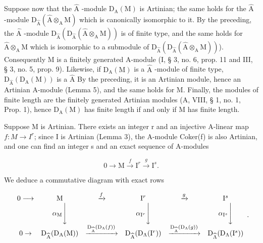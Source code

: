 Suppose now that the \(\widehat{\mathrm{A}}\) -module \(\mathrm{D}_{\mathrm{A}}(\mathrm{M})\) is Artinian; the same holds for the \(\widehat{\mathrm{A}}\) -module \(\mathrm{D}_{\widehat{\mathrm{A}}}(\widehat{\mathrm{A}} \otimes_{\mathrm{A}} \mathrm{M})\) which is canonically isomorphic to it. By the preceding, the \(\widehat{\mathrm{A}}\) -module \(\mathrm{D}_{\widehat{\mathrm{A}}}(\mathrm{D}_{\widehat{\mathrm{A}}}(\widehat{\mathrm{A}} \otimes_{\mathrm{A}} \mathrm{M}))\) is of finite type, and the same holds for \(\widehat{\mathrm{A}} \otimes_{\mathrm{A}} \mathrm{M}\) which is isomorphic to a submodule of \(\mathrm{D}_{\widehat{\mathrm{A}}}(\mathrm{D}_{\widehat{\mathrm{A}}}(\widehat{\mathrm{A}} \otimes_{\mathrm{A}} \mathrm{M}))\)). Consequently M is a finitely generated A-module (I, § 3, no. 6, prop. 11 and III, § 3, no. 5, prop. 9). Likewise, if \(\mathrm{D}_{\mathrm{A}}(\mathrm{M})\) is a \(\widehat{\mathrm{A}}\) -module of finite type, \(\mathrm{D}_{\widehat{\mathrm{A}}}(\mathrm{D}_{\mathrm{A}}(\mathrm{M}))\) is a \(\widehat{\mathrm{A}}\) By the preceding, it is an Artinian module, hence an Artinian A-module (Lemma 5), and the same holds for M. Finally, the modules of finite length are the finitely generated Artinian modules (A, VIII, § 1, no. 1, Prop. 1), hence \(\mathrm{D}_{\mathrm{A}}(\mathrm{M})\) has finite length if and only if M has finite length.

Suppose M is Artinian. There exists an integer r and an injective A-linear map \(f : M \to I^{r}\); since I is Artinian (Lemma 3), the A-module Coker(f) is also Artinian, and one can find an integer s and an exact sequence of A-modules

\[
0 \to \mathrm{M} \stackrel {f} {\longrightarrow} \mathrm{I} ^ {r} \stackrel {g} {\longrightarrow} \mathrm{I} ^ {s}.
\]

We deduce a commutative diagram with exact rows

\[
\begin{array}{c c c c c c} 0 \longrightarrow & \mathrm{M} & \xrightarrow {f} & \mathrm{I} ^ {r} & \xrightarrow {g} & \mathrm{I} ^ {s} \\ & \alpha_ {\mathrm{M}} \Biggl \downarrow & & \alpha_ {\mathrm{I} ^ {r}} \Biggl \downarrow & & \alpha_ {\mathrm{I} ^ {s}} \Biggl \downarrow \\ 0 \to & \mathrm{D} _ {\widehat {\mathrm{A}}} (\mathrm{D} _ {\mathrm{A}} (\mathrm{M})) & \xrightarrow {\mathrm{D} _ {\widehat {\mathrm{A}}} (\mathrm{D} _ {\Lambda} (f))} & \mathrm{D} _ {\widehat {\mathrm{A}}} (\mathrm{D} _ {\Lambda} (\mathrm{I} ^ {r})) & \xrightarrow {\mathrm{D} _ {\widehat {\mathrm{A}}} (\mathrm{D} _ {\Lambda} (g))} & \mathrm{D} _ {\widehat {\Lambda}} (\mathrm{D} _ {\Lambda} (\mathrm{I} ^ {s})) \end{array} .
\]

